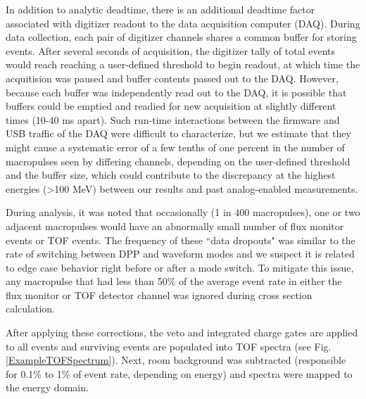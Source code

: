 \documentclass[twocolumn,secnumarabic,amssymb, nobibnotes, aps, prl,
superscriptaddress, nobalancelastpage]{revtex4}
\begin{document}
In addition to analytic deadtime, there is an additional deadtime factor associated with 
digitizer readout to the data acquisition computer (DAQ). During data
collection, each pair of digitizer channels shares a common buffer for storing events.
After several seconds of acquisition, the digitizer tally of total events would
reach reaching a user-defined threshold to begin readout, at which time the
acquitision was paused and buffer contents passed out to the DAQ. However,
because each buffer was independently read out to the DAQ, it is possible that buffers
could be emptied and readied for new acquisition at slightly different times
(10-40 ms apart). Such run-time interactions between the firmware and USB
traffic of the DAQ were difficult to characterize, but we estimate that they might cause a 
systematic error of a few tenths of one
percent in the number of macropulses seen by differing channels, depending on the user-defined 
threshold and the buffer size, which could contribute to the discrepancy at the
highest energies (>100 MeV) between our results and past analog-enabled
measurements. 

During analysis, it was noted that occasionally (1 in 400 macropulses), one or two 
adjacent macropulses would have an abnormally small number of flux monitor events or 
TOF events. The frequency of these ``data dropouts" was similar to the rate of
switching between DPP and waveform modes and we suspect it is related to edge
case behavior right before or after a mode switch. To mitigate this issue,
any macropulse that had less than 50\% of the average event rate in either the
flux monitor or TOF detector channel was ignored during cross section calculation.

After applying these corrections, the veto and integrated charge gates are applied to 
all events and surviving events are populated into TOF spectra (see Fig.
\ref{ExampleTOFSpectrum}). Next, room background was subtracted (responsible for 0.1\% to 
1\% of event rate, depending on energy) and spectra were mapped to the energy domain.
\end{document}
